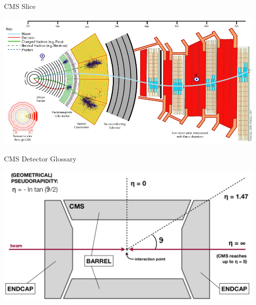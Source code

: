 \begin{frame}{CMS Slice}
\begin{center}
\includegraphics[width=0.99\textwidth]{images/CMS_Slice.png}
\end{center}
\end{frame}

\begin{frame}{CMS Detector Glossary}
\begin{center}
\includegraphics[width=0.99\textwidth]{images/DetectorGlossary.png}
\end{center}
\end{frame}


